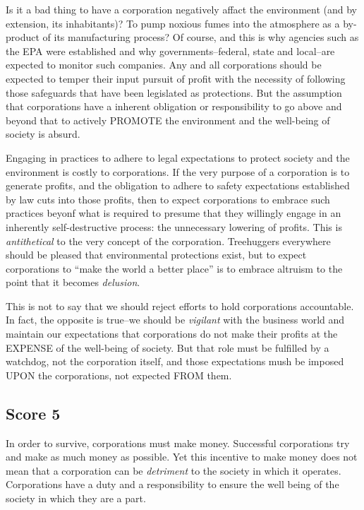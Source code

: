 Is it a bad thing to have a corporation negatively affact the environment (and by extension, its inhabitants)?
To pump noxious fumes into the atmosphere as a by-product of its manufacturing process?
Of course, and this is why agencies such as the EPA were established and why governments--federal, state and local--are expected to monitor such companies.
Any and all corporations should be expected to temper their input pursuit of profit with the necessity of following those safeguards that have been legislated as protections.
But the assumption that corporations have a inherent obligation or responsibility to go above and beyond that to actively PROMOTE the environment and the well-being of society is absurd.

Engaging in practices to adhere to legal expectations to protect society and the environment is costly to corporations.
If the very purpose of a corporation is to generate profits, and the obligation to adhere to safety expectations established by law cuts into those profits, then to expect corporations to embrace such practices beyonf what is required to presume that they willingly engage in an inherently self-destructive process: the unnecessary lowering of profits.
This is \emph{antithetical} to the very concept of the corporation.
Treehuggers everywhere should be pleased that environmental protections exist, but to expect corporations to ``make the world a better place'' is to embrace altruism to the point that it becomes \emph{delusion}.

This is not to say that we should reject efforts to hold corporations accountable.
In fact, the opposite is true--we should be \emph{vigilant} with the business world and maintain our expectations that corporations do not make their profits at the EXPENSE of the well-being of society.
But that role must be fulfilled by a watchdog, not the corporation itself, and those expectations mush be imposed UPON the corporations, not expected FROM them.

\subsection{Score 5}
In order to survive, corporations must make money.
Successful corporations try and make as much money as possible.
Yet this incentive to make money does not mean that a corporation can be \emph{detriment} to the society in which it operates.
Corporations have a duty and a responsibility to ensure the well being of the society in which they are a part.

